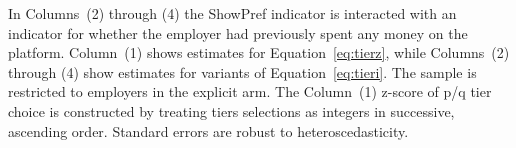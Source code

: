 \begin{table}[!htbp]
\begin{minipage}{1\linewidth}
In Columns~(2) through (4) the ShowPref indicator is interacted with an indicator for whether the employer had previously spent any money on the platform.
Column~(1) shows estimates for Equation~\ref{eq:tierz}, while Columns~(2) through (4) show estimates for variants of Equation~\ref{eq:tieri}. 
The sample is restricted to employers in the explicit arm. \explicitdef \tierdef
The Column~(1) z-score of p/q tier choice is constructed by treating tiers selections as integers in successive, ascending order.
Standard errors are robust to heteroscedasticity. 
 \starlanguage
 \end{minipage}
\end{table}
